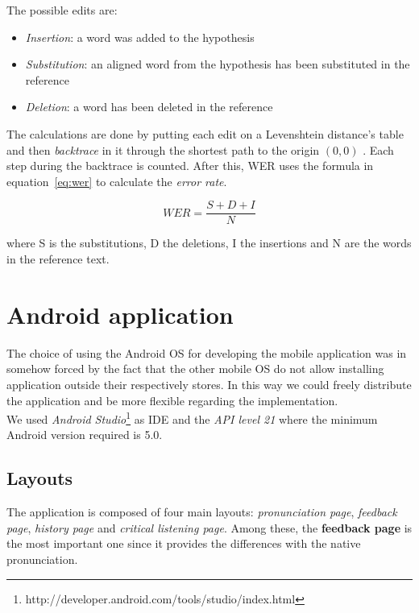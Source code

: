 \noindent The possible edits are:

\begin{itemize}
	\item \textit{Insertion}: a word was added to the hypothesis
	\item \textit{Substitution}: an aligned word from the hypothesis has been substituted in the reference
	\item \textit{Deletion}: a word has been deleted in the reference
\end{itemize}

\noindent The calculations are done by putting each edit on a Levenshtein distance's table and then \textit{backtrace} in it through the shortest path to the origin $(0, 0)$ \cite{WER}. Each step during the backtrace is counted. After this, WER uses the formula in equation~\ref{eq:wer} to calculate the \textit{error rate}.

\begin{equation}
\label{eq:wer}
	WER = \frac{S + D + I}{N}
\end{equation}

\noindent where S is the substitutions, D the deletions, I the insertions and N are the words in the reference text.




\section{Android application}
\label{sec:android_app}
\noindent The choice of using the Android OS for developing the mobile application was in somehow forced by the fact that the other mobile OS do not allow installing application outside their respectively stores. In this way we could freely distribute the application and be more flexible regarding the implementation. \\
\noindent We used \textit{Android Studio}\footnote{http://developer.android.com/tools/studio/index.html} as IDE and the \textit{API level 21} where the minimum  Android version required is 5.0.

\subsection{Layouts}
\label{ssec:layouts}
The application is composed of four main layouts: \textit{pronunciation page}, \textit{feedback page}, \textit{history page} and \textit{critical listening page}. Among these, the \textbf{feedback page} is the most important one since it provides the differences with the native pronunciation. \\

